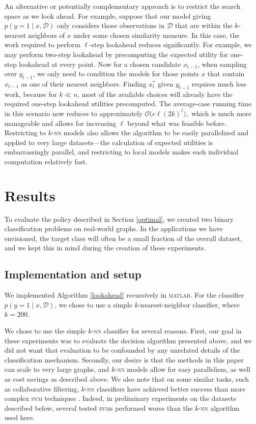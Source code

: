 \documentclass{article}
\newcommand{\cm}[1]{\mathcal{#1}}
\newcommand{\data}{\cm{D}}
\newcommand{\given}{\mid}
\begin{document}
An alternative or potentially complementary approach is to restrict
the search space as we look ahead.  For example, suppose that our
model giving $p(y = 1\given x, \data)$ only considers those
observations in $\data$ that are within the $k$-nearest neighbors of
$x$ under some chosen similarity measure.  In this case, the work
required to perform $\ell$-step lookahead reduces significantly.  For
example, we may perform two-step lookahead by precomputing the
expected utility for one-step lookahead at every point.  Now for a
chosen candidate $x_{t-1}$, when sampling over $y_{t-1}$, we only need
to condition the models for those points $x$ that contain $x_{t-1}$ as
one of their nearest neighbors.  Finding $x_t^\ast$ given $y_{t-1}$
requires much less work, because for $k \ll n$, most of the available
choices will already have the required one-step lookahead utilities
precomputed.  The average-case running time in this scenario now
reduces to approximately $\cm{O}\bigl(c\ell(2k)^\ell\bigr),$ which is
much more manageable and allows for increasing $\ell$ beyond what was
feasible before.  Restricting to $k$-\textsc{nn} models also allows
the algorithm to be easily parallelized and applied to very large
datasets---the calculation of expected utilities is embarrassingly
parallel, and restricting to local models makes each individual
computation relatively fast.

\section{Results}

To evaluate the policy described in Section \ref{optimal}, we created
two binary classification problems on real-world graphs.  In the
applications we have envisioned, the target class will often be a
small fraction of the overall dataset, and we kept this in mind during
the creation of these experiments.

\subsection{Implementation and setup}

We implemented Algorithm \ref{lookahead} recursively in
\textsc{matlab}.  For the classifier $p(y = 1 \given x, \data)$, we
chose to use a simple $k$-nearest-neighbor classifier, where $k =
200$.

We chose to use the simple $k$-\textsc{nn} classifier for several
reasons.  First, our goal in these experiments was to evaluate the
decision algorithm presented above, and we did not want that
evaluation to be confounded by any unrelated details of the
classification mechanism.  Secondly, our desire is that the methods in
this paper can scale to very large graphs, and $k$-\textsc{nn} models
allow for easy parallelism, as well as cost savings as described
above.  We also note that on some similar tasks, such as collaborative
filtering, $k$-\textsc{nn} classifiers have achieved better success
than more complex \textsc{svm} techniques \citep{knnvssvm}.  Indeed,
in preliminary experiments on the datasets described below, several
tested \textsc{svm}s performed worse than the $k$-\textsc{nn}
algorithm used here.
\end{document}

